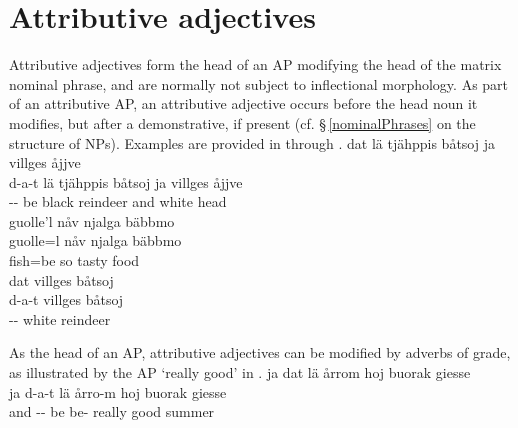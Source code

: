 \section{Attributive adjectives}\label{adjectivesATTR}
Attributive adjectives form the head of an AP modifying the head of the matrix nominal phrase, and are normally not subject to inflectional morphology. 
As part of an attributive AP, an attributive adjective occurs before the head noun it modifies, but after a demonstrative, if present (cf. §\,\ref{nominalPhrases} on the structure of NPs). Examples are provided in  through . 
\ea\label{adjEx1}
\glll	dat lä tjähppis båtsoj ja villges åjjve\\
	d-a-t lä tjähppis båtsoj ja villges åjjve\\
	-- be\BS{} black reindeer\BS{} and white head\BS{}\\\nopagebreak
{}	
\z
\ea\label{adjEx2}
\glll	guolle'l nåv njalga bäbbmo\\
	guolle=l nåv njalga bäbbmo\\
	fish\BS{}=be\BS{} so tasty food\BS{}\\\nopagebreak
{}	
\z
\ea\label{adjEx3}
\glll	dat villges båtsoj\\
	d-a-t villges båtsoj\\
	-- white reindeer\BS{}\\\nopagebreak
{}	
\z

As the head of an AP, attributive adjectives can be modified by adverbs of grade, as illustrated by the AP  ‘really good’ in .
\ea\label{adjEx4}
\glll	ja dat lä årrom hoj buorak giesse\\
	ja d-a-t lä årro-m hoj buorak giesse\\
	and -- be\BS{} be- really good summer\BS{}\\\nopagebreak
{}	
\z

